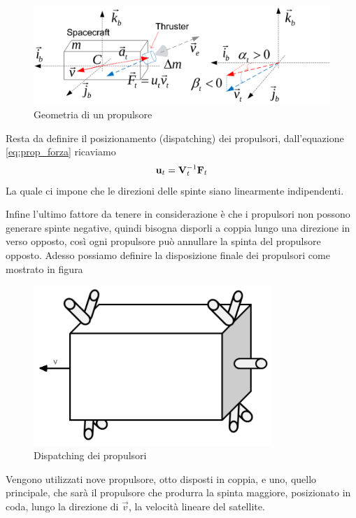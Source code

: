 \begin{figure}[htp]
\begin{center}
  \includegraphics[width=\textwidth]
  {modelling/attitude_kinematics_and_dynamics/image/geometria_del_propulsore.png}
  \caption{Geometria di un propulsore}
  \label{fig:geom_propulsore}
\end{center}
\end{figure}

Resta da definire il posizionamento (dispatching) dei propulsori, dall'equazione
\ref{eq:prop_forza} ricaviamo
\begin{equation}
{\bf u}_t={\bf V}_t^{-1}{\bf F}_t
\end{equation}
La quale ci impone che le direzioni delle spinte siano linearmente indipendenti.

Infine l'ultimo fattore da tenere in considerazione è che i propulsori non
possono generare spinte negative, quindi bisogna disporli a coppia lungo una
direzione in verso opposto, così ogni propulsore può annullare la spinta del
propulsore opposto. Adesso possiamo definire la disposizione finale dei
propulsori come mostrato in figura

\begin{figure}[htp]
\begin{center}
  \includegraphics[width=9cm]
  {modelling/attitude_kinematics_and_dynamics/image/dispatching.png}
  \caption{Dispatching dei propulsori}
  \label{fig:dispatching}
\end{center}
\end{figure}

Vengono utilizzati nove propulsore, otto disposti in coppia, e uno, quello
principale, che sarà il propulsore che produrra la spinta maggiore, posizionato
in coda, lungo la direzione di $\vec{v}$, la velocità lineare del satellite.